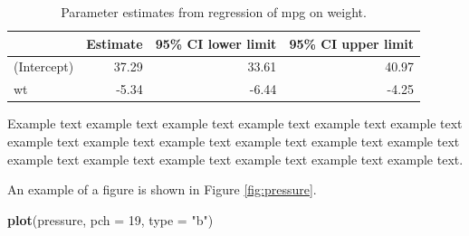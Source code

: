 \documentclass[
  openany]{book}
\newenvironment{Shaded}{\begin{snugshade}}{\end{snugshade}}
\newcommand{\DataTypeTok}[1]{\textcolor[rgb]{0.13,0.29,0.53}{#1}}
\newcommand{\DecValTok}[1]{\textcolor[rgb]{0.00,0.00,0.81}{#1}}
\newcommand{\KeywordTok}[1]{\textcolor[rgb]{0.13,0.29,0.53}{\textbf{#1}}}
\newcommand{\NormalTok}[1]{#1}
\newcommand{\OperatorTok}[1]{\textcolor[rgb]{0.81,0.36,0.00}{\textbf{#1}}}
\newcommand{\OtherTok}[1]{\textcolor[rgb]{0.56,0.35,0.01}{#1}}
\newcommand{\StringTok}[1]{\textcolor[rgb]{0.31,0.60,0.02}{#1}}
\begin{document}
\begin{Shaded}
\end{Shaded}

\begin{table}[H]

\caption{\label{tab:mtreg}Parameter estimates from regression of mpg on weight.}
\centering
\begin{tabular}[t]{lrrr}
\toprule
  & Estimate & 95\% CI lower limit & 95\% CI upper limit\\
\midrule
(Intercept) & 37.29 & 33.61 & 40.97\\
wt & -5.34 & -6.44 & -4.25\\
\bottomrule
\end{tabular}
\end{table}

Example text example text example text example text example text example text example text example text example text example text example text example text example text example text example text example text example text example text.

An example of a figure is shown in Figure \ref{fig:pressure}.

\begin{Shaded}
\begin{Highlighting}[]
\KeywordTok{plot}\NormalTok{(pressure, }\DataTypeTok{pch =} \DecValTok{19}\NormalTok{, }\DataTypeTok{type =} \StringTok{"b"}\NormalTok{)}
\end{Highlighting}
\end{Shaded}
\end{document}
